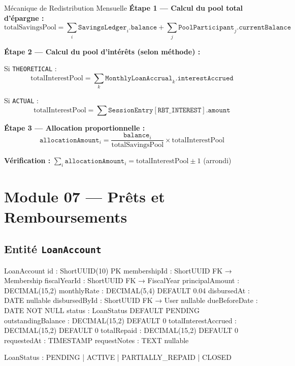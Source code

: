 \documentclass[12pt, a4paper]{report}
\begin{document}
\begin{ruleBox}{Mécanique de Redistribution Mensuelle}
\textbf{Étape 1 — Calcul du pool total d'épargne :}
$$\text{totalSavingsPool} = \sum_i \texttt{SavingsLedger}_i.\texttt{balance} + \sum_j \texttt{PoolParticipant}_j.\texttt{currentBalance}$$

\textbf{Étape 2 — Calcul du pool d'intérêts (selon méthode) :}

Si \texttt{THEORETICAL} :
$$\text{totalInterestPool} = \sum_k \texttt{MonthlyLoanAccrual}_k.\texttt{interestAccrued}$$

Si \texttt{ACTUAL} :
$$\text{totalInterestPool} = \sum \texttt{SessionEntry}[\texttt{RBT\_INTEREST}].\texttt{amount}$$

\textbf{Étape 3 — Allocation proportionnelle :}
$$\texttt{allocationAmount}_i = \frac{\texttt{balance}_i}{\text{totalSavingsPool}} \times \text{totalInterestPool}$$

\textbf{Vérification :} $\sum_i \texttt{allocationAmount}_i = \text{totalInterestPool} \pm 1$ (arrondi)
\end{ruleBox}

\section{Module 07 — Prêts et Remboursements}

\subsection{Entité \texttt{LoanAccount}}

\begin{codeBox}
LoanAccount {
  id                    : ShortUUID(10)  PK
  membershipId          : ShortUUID      FK → Membership
  fiscalYearId          : ShortUUID      FK → FiscalYear
  principalAmount       : DECIMAL(15,2)
  monthlyRate           : DECIMAL(5,4)   DEFAULT 0.04
  disbursedAt           : DATE           nullable
  disbursedById         : ShortUUID FK → User  nullable
  dueBeforeDate         : DATE           NOT NULL
  status                : LoanStatus     DEFAULT PENDING
  outstandingBalance    : DECIMAL(15,2)  DEFAULT 0
  totalInterestAccrued  : DECIMAL(15,2)  DEFAULT 0
  totalRepaid           : DECIMAL(15,2)  DEFAULT 0
  requestedAt           : TIMESTAMP
  requestNotes          : TEXT           nullable
}

LoanStatus : PENDING | ACTIVE | PARTIALLY_REPAID | CLOSED
\end{codeBox}
\end{document}
